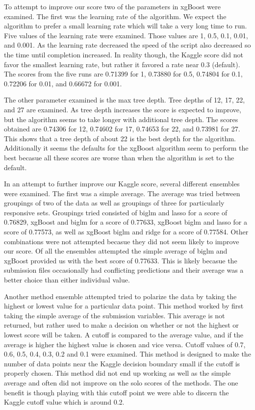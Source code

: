 \documentclass[aps, reprint, groupedaddress, superscriptaddress, amsmath, 10pt]{revtex4-1}
\begin{document}
	To attempt to improve our score two of the parameters in xgBoost were examined.  The first was the learning rate of the algorithm.  We expect the algorithm to prefer a small learning rate which will take a very long time to run.  Five values of the learning rate were examined.  Those values are 1, 0.5, 0.1, 0.01, and 0.001.  As the learning rate decreased the speed of the script also decreased so the time until completion increased. In reality though, the Kaggle score did not favor the smallest learning rate, but rather it favored a rate near 0.3 (default).  The scores from the five runs are 0.71399 for 1, 0.73880 for 0.5, 0.74804 for 0.1, 0.72206 for 0.01, and 0.66672 for 0.001.
	
	The other parameter examined is the max tree depth.  Tree depths of 12, 17, 22, and 27 are examined.  As tree depth increases the score is expected to improve, but the algorithm  seems to take longer with additional tree depth.  The scores obtained are 0.74306 for 12, 0.74602 for 17, 0.74653 for 22, and 0.73981 for 27. This shows that a tree depth of about 22 is the best depth for the algorithm.  Additionally it seems the defaults for the xgBoost algorithm seem to perform the best becasue all these scores are worse than when the algorithm is set to the default.
	
	In an attempt to further improve our Kaggle score, several different ensembles were examined.  The first was a simple average. The average was tried between groupings of two of the data as well as groupings of three for particularly responsive sets.  Groupings tried consisted of biglm and lasso for a score of 0.76829, xgBoost and biglm for a score of 0.77633, xgBoost biglm and lasso for a score of 0.77573, as well as xgBoost biglm and ridge for a score of 0.77584. Other combinations were not attempted becasue they did not seem likely to improve our score.  Of all the ensembles attempted the simple average of biglm and xgBoost provided us with the best score of 0.77633. This is likely becasue the submission files occasionally had conflicting predictions and their average was a better choice than either individual value.
	
	Another method ensemble attempted tried to polarize the data by taking the highest or lowest value for a particular data point. This method worked by first taking the simple average of the submission variables.  This average is not returned, but rather used to make a decision on whether or not the highest or lowest score will be taken. A cutoff is compared to the average value, and if the average is higher the highest value is chosen and vice versa.  Cutoff values of 0.7, 0.6, 0.5, 0.4, 0.3, 0.2 and 0.1 were examined.   This method is designed to make the number of data points near the Kaggle decision boundary small if the cutoff is properly chosen.  This method did not end up working as well as the simple average and often did not improve on the solo scores of the methods. The one benefit is though playing with this cutoff point we were able to discern the Kaggle cutoff value which is around 0.2.  
	
\end{document}
